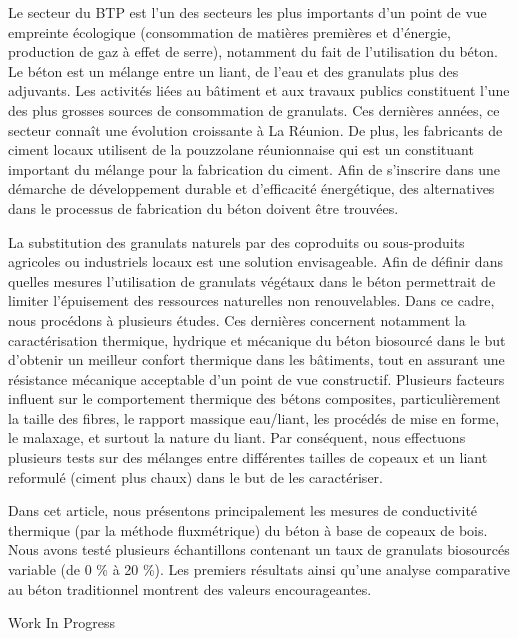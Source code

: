 {\normalsize
Le secteur du BTP est l'un des secteurs les plus importants d'un point de vue empreinte écologique (consommation de matières premières et d'énergie, production de gaz à effet de serre), notamment du fait de l'utilisation du béton. Le béton est un mélange entre un liant, de l'eau et des granulats plus des adjuvants. Les activités liées au bâtiment et aux travaux publics constituent l'une des plus grosses sources de consommation de granulats. Ces dernières années, ce secteur connaît une évolution croissante à La Réunion. De plus, les fabricants de ciment locaux utilisent de la pouzzolane réunionnaise qui est un constituant important du mélange pour la fabrication du ciment. Afin de s'inscrire dans une démarche de développement durable et d'efficacité énergétique, des alternatives dans le processus de fabrication du béton doivent être trouvées. 







La substitution des granulats naturels par des coproduits ou sous-produits agricoles ou industriels locaux est une solution envisageable. Afin de définir dans quelles mesures l'utilisation de granulats végétaux dans le béton permettrait de limiter l'épuisement des ressources naturelles non renouvelables. Dans ce cadre, nous procédons à plusieurs études. Ces dernières concernent notamment la caractérisation thermique, hydrique et mécanique du béton biosourcé dans le but d'obtenir un meilleur confort thermique dans les bâtiments, tout en assurant une résistance mécanique acceptable d'un point de vue constructif. Plusieurs facteurs influent sur le comportement thermique des bétons composites, particulièrement la taille des fibres, le rapport massique eau/liant, les procédés de mise en forme, le malaxage, et surtout la nature du liant. Par conséquent, nous effectuons plusieurs tests sur des mélanges entre différentes tailles de copeaux et un liant reformulé (ciment plus chaux) dans le but de les caractériser. 







Dans cet article, nous présentons principalement les mesures de conductivité thermique (par la méthode fluxmétrique) du béton à base de copeaux de bois. Nous avons testé plusieurs échantillons contenant un taux de granulats biosourcés variable (de 0 \% à 20 \%). Les premiers résultats ainsi qu'une analyse comparative au béton traditionnel montrent des valeurs encourageantes.

 \vfill Work In Progress

}
 
